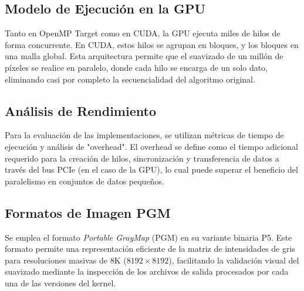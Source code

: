 \subsection{Modelo de Ejecución en la GPU}
Tanto en OpenMP Target como en CUDA, la GPU ejecuta miles de hilos de forma concurrente. En CUDA, estos hilos se agrupan en bloques, y los bloques en una malla global. Esta arquitectura permite que el suavizado de un millón de píxeles se realice en paralelo, donde cada hilo se encarga de un solo dato, eliminando casi por completo la secuencialidad del algoritmo original.

\subsection{Análisis de Rendimiento}
Para la evaluación de las implementaciones, se utilizan métricas de tiempo de ejecución y análisis de "overhead". El overhead se define como el tiempo adicional requerido para la creación de hilos, sincronización y transferencia de datos a través del bus PCIe (en el caso de la GPU), lo cual puede superar el beneficio del paralelismo en conjuntos de datos pequeños.

\subsection{Formatos de Imagen PGM}
Se emplea el formato \textit{Portable GrayMap} (PGM) en su variante binaria P5. Este formato permite una representación eficiente de la matriz de intensidades de gris para resoluciones masivas de 8K ($8192 \times 8192$), facilitando la validación visual del suavizado mediante la inspección de los archivos de salida procesados por cada una de las versiones del kernel.